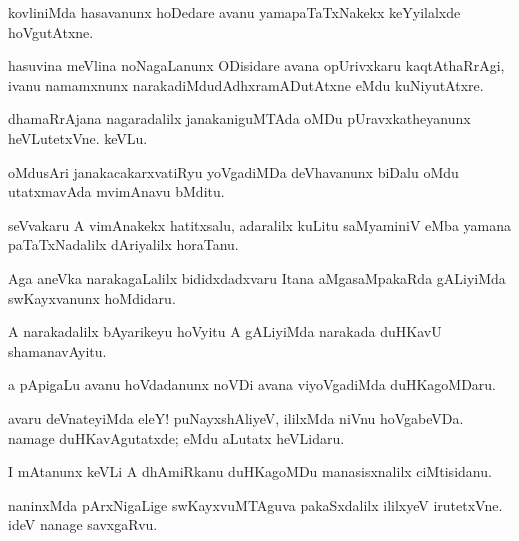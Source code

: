\documentclass{article}
\begin{document}
\begin{mn}%
kovliniMda hasavanunx hoDedare avanu yamapaTaTxNakekx keYyilalxde hoVgutAtxne.
\end{mn}

\begin{mn}%
hasuvina meVlina noNagaLanunx ODisidare avana opUrivxkaru kaqtAthaRrAgi, ivanu namamxnunx 
narakadiMdudAdhxramADutAtxne eMdu kuNiyutAtxre.
\end{mn}

\begin{mn}%
dhamaRrAjana nagaradalilx janakaniguMTAda oMDu pUravxkatheyanunx heVLutetxVne. keVLu.
\end{mn}

\begin{mn}%
oMdusAri janakacakarxvatiRyu yoVgadiMDa deVhavanunx biDalu oMdu utatxmavAda mvimAnavu bMditu.
\end{mn}

\begin{mn}%
seVvakaru A vimAnakekx hatitxsalu, adaralilx kuLitu saMyaminiV eMba yamana paTaTxNadalilx 
dAriyalilx horaTanu.
\end{mn}

\begin{mn}%
Aga aneVka narakagaLalilx bididxdadxvaru Itana aMgasaMpakaRda gALiyiMda swKayxvanunx 
hoMdidaru.
\end{mn}

\begin{mn}%
A narakadalilx bAyarikeyu hoVyitu A gALiyiMda narakada duHKavU shamanavAyitu.
\end{mn}

\begin{mn}%
a pApigaLu avanu hoVdadanunx noVDi avana viyoVgadiMda duHKagoMDaru.
\end{mn}

\begin{mn}%
avaru deVnateyiMda eleY! puNayxshAliyeV, ililxMda niVnu hoVgabeVDa. namage duHKavAgutatxde; 
eMdu aLutatx heVLidaru.
\end{mn}

\begin{mn}%
I mAtanunx keVLi A dhAmiRkanu duHKagoMDu manasisxnalilx ciMtisidanu.
\end{mn}

\begin{mn}%
naninxMda pArxNigaLige swKayxvuMTAguva pakaSxdalilx ililxyeV irutetxVne. ideV nanage 
savxgaRvu.
\end{mn}
\end{document}
